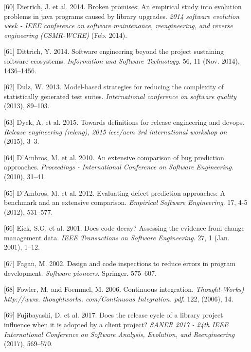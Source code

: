 \documentclass[]{book}
\begin{document}
\hypertarget{ref-Dietrich2014}{}
{[}60{]} Dietrich, J. et al. 2014. Broken promises: An empirical study
into evolution problems in java programs caused by library upgrades.
\emph{2014 software evolution week - IEEE conference on software
maintenance, reengineering, and reverse engineering (CSMR-WCRE)} (Feb.
2014).

\hypertarget{ref-Dittrich2014}{}
{[}61{]} Dittrich, Y. 2014. Software engineering beyond the project
sustaining software ecosystems. \emph{Information and Software
Technology}. 56, 11 (Nov. 2014), 1436--1456.

\hypertarget{ref-dulz2013model}{}
{[}62{]} Dulz, W. 2013. Model-based strategies for reducing the
complexity of statistically generated test suites. \emph{International
conference on software quality} (2013), 89--103.

\hypertarget{ref-dyck2015a}{}
{[}63{]} Dyck, A. et al. 2015. Towards definitions for release
engineering and devops. \emph{Release engineering (releng), 2015
ieee/acm 3rd international workshop on} (2015), 3--3.

\hypertarget{ref-DAmbros2010}{}
{[}64{]} D'Ambros, M. et al. 2010. An extensive comparison of bug
prediction approaches. \emph{Proceedings - International Conference on
Software Engineering}. (2010), 31--41.

\hypertarget{ref-DAmbros2012}{}
{[}65{]} D'Ambros, M. et al. 2012. Evaluating defect prediction
approaches: A benchmark and an extensive comparison. \emph{Empirical
Software Engineering}. 17, 4-5 (2012), 531--577.

\hypertarget{ref-eick2001}{}
{[}66{]} Eick, S.G. et al. 2001. Does code decay? Assessing the evidence
from change management data. \emph{IEEE Transactions on Software
Engineering}. 27, 1 (Jan. 2001), 1--12.

\hypertarget{ref-fagan2002design}{}
{[}67{]} Fagan, M. 2002. Design and code inspections to reduce errors in
program development. \emph{Software pioneers}. Springer. 575--607.

\hypertarget{ref-fowler2006continuous}{}
{[}68{]} Fowler, M. and Foemmel, M. 2006. Continuous integration.
\emph{Thought-Works) http://www. thoughtworks. com/Continuous
Integration. pdf}. 122, (2006), 14.

\hypertarget{ref-fujibayashi2017a}{}
{[}69{]} Fujibayashi, D. et al. 2017. Does the release cycle of a
library project influence when it is adopted by a client project?
\emph{SANER 2017 - 24th IEEE International Conference on Software
Analysis, Evolution, and Reengineering} (2017), 569--570.
\end{document}
